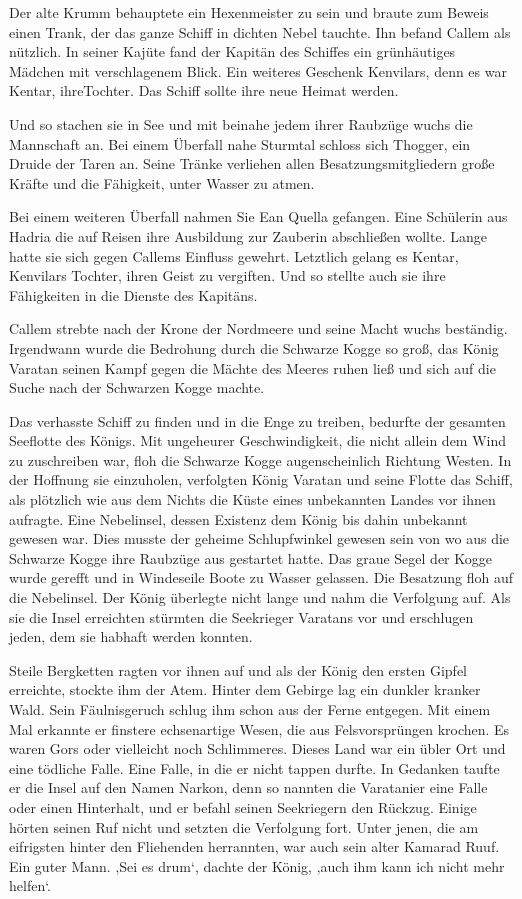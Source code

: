 \documentclass[10pt, a4paper, oneside]{book}
\begin{document}
\begin{multicols}{2}
Der alte Krumm behauptete ein Hexenmeister zu sein und braute zum Beweis einen Trank, der das ganze Schiff in dichten Nebel tauchte. Ihn befand Callem als nützlich. In seiner Kajüte fand der Kapitän des Schiffes ein grünhäutiges Mädchen mit verschlagenem Blick. Ein weiteres Geschenk Kenvilars, denn es war Kentar, ihreTochter. Das Schiff sollte ihre neue Heimat werden.

Und so stachen sie in See und mit beinahe jedem ihrer Raubzüge wuchs die Mannschaft an. Bei einem Überfall nahe Sturmtal schloss sich Thogger, ein Druide der Taren an. Seine Tränke verliehen allen Besatzungsmitgliedern große Kräfte und die Fähigkeit, unter Wasser zu atmen.\bigskip

Bei einem weiteren Überfall nahmen Sie Ean Quella gefangen. Eine Schülerin aus Hadria die auf Reisen ihre Ausbildung zur Zauberin abschließen wollte. Lange hatte sie sich gegen Callems Einfluss gewehrt. Letztlich gelang es Kentar, Kenvilars Tochter, ihren Geist zu vergiften. Und so stellte auch sie ihre Fähigkeiten in die Dienste des Kapitäns.\bigskip

Callem strebte nach der Krone der Nordmeere und seine Macht wuchs beständig. Irgendwann wurde die Bedrohung durch die Schwarze Kogge so groß, das König Varatan seinen Kampf gegen die Mächte des Meeres ruhen ließ und sich auf die Suche nach der Schwarzen Kogge machte.

Das verhasste Schiff zu finden und in die Enge zu treiben, bedurfte der gesamten  Seeflotte des Königs. Mit ungeheurer Geschwindigkeit, die nicht allein dem Wind zu zuschreiben war, floh die Schwarze Kogge augenscheinlich Richtung Westen. In der Hoffnung sie einzuholen, verfolgten König Varatan und seine Flotte das Schiff, als plötzlich wie aus dem Nichts die Küste eines unbekannten Landes vor ihnen aufragte. Eine Nebelinsel, dessen Existenz dem König bis dahin unbekannt gewesen war. Dies musste der geheime Schlupfwinkel gewesen sein von wo aus die Schwarze Kogge ihre Raubzüge aus gestartet hatte. Das graue Segel der Kogge wurde gerefft und in Windeseile Boote zu Wasser gelassen. Die Besatzung floh auf die Nebelinsel. Der König überlegte nicht lange und nahm die Verfolgung auf. Als sie die Insel erreichten stürmten die Seekrieger Varatans vor und erschlugen jeden, dem sie habhaft werden konnten.\bigskip

Steile Bergketten ragten vor ihnen auf und als der König den ersten Gipfel erreichte, stockte ihm der Atem. Hinter dem Gebirge lag ein dunkler kranker Wald. Sein Fäulnisgeruch schlug ihm schon aus der Ferne entgegen. Mit einem Mal erkannte er finstere echsenartige Wesen, die aus Felsvorsprüngen krochen. Es waren Gors oder vielleicht noch Schlimmeres. Dieses Land war ein übler Ort und eine tödliche Falle. Eine Falle, in die er nicht tappen durfte. In Gedanken taufte er die Insel auf den Namen Narkon, denn so nannten die Varatanier eine Falle oder einen Hinterhalt, und er befahl seinen Seekriegern den Rückzug. Einige hörten seinen Ruf nicht und setzten die Verfolgung fort. Unter jenen, die am eifrigsten hinter den Fliehenden herrannten, war auch sein alter Kamarad Ruuf. Ein guter Mann. ‚Sei es drum‘, dachte der König, ‚auch ihm kann ich nicht mehr helfen‘.


\end{multicols}
\end{document}
